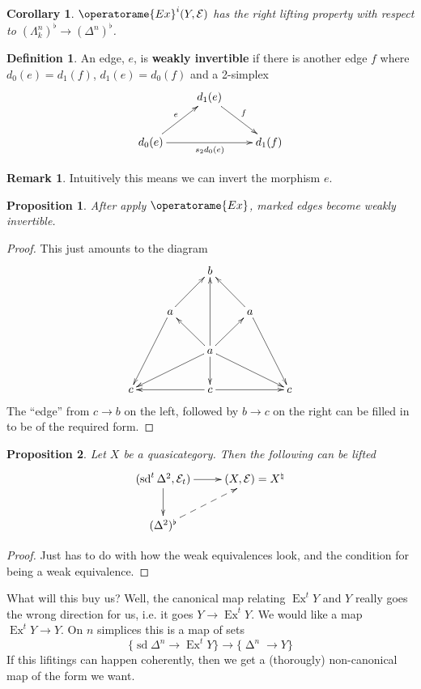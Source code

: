 \documentclass[english]{amsart}
\newcommand{\mc}{\mathcal}
\newcommand{\Ex}{\operatorame{Ex}}
\newtheorem*{cor}{Corollary}
\newtheorem*{prop}{Proposition}
\theoremstyle{definition}
\newtheorem*{defn}{Definition}
\newtheorem*{rmk}{Remark}
\begin{document}
\begin{cor}
$\Ex^i (Y,\mc{E})$ has the right lifting property with respect to $(\Lambda^n_k)^\flat \to (\Delta^n)^\flat$. 
\end{cor}





\begin{defn}
An edge, $e$, is \textbf{weakly invertible} if there is another edge $f$ where $d_0 (e) = d_1 (f)$, $d_1 (e) = d_0 (f)$ and a 2-simplex
\[
\xymatrix{
 &  d_1 (e) \ar[dr]^f & \\
d_0 (e) \ar[ur]^e \ar[rr]_{s_2 d_0 (e)} & & d_1 (f) 
}
\]
\end{defn}

\begin{rmk}
Intuitively this means we can invert the morphism $e$. 
\end{rmk}

\begin{prop}
After apply $\Ex$, marked edges become weakly invertible. 
\end{prop}
\begin{proof}
This just amounts to the diagram
\[
\xymatrix{
 & & b & & \\
 & a\ar[ur]\ar[ddl] & & a \ar[ul]\ar[ddr]& \\
 & & a\ar[uu]\ar[dll]\ar[drr] \ar[ul]\ar[ur]\ar[d] & & \\
c & &c\ar[ll]\ar[rr] & & c
} 
\]
The ``edge'' from $c \to b$ on the left, followed by $b \to c$ on the right can be filled in to be of the required form. 
\end{proof}







\begin{prop}
Let $X$ be a quasicategory. Then the following can be lifted
\[
\xymatrix{
(\operatorname{sd}^t \Delta^2, \mc{E}_t) \ar[d]\ar[r] & (X,\mc{E}) = X^\natural\\
(\Delta^2)^\flat \ar@{-->}[ur] & 
}
\]
\end{prop}
\begin{proof}
Just has to do with how the weak equivalences look, and the condition for being a weak equivalence. 
\end{proof}

What will this buy us? Well, the canonical map relating $\operatorname{Ex}^t Y$ and $Y$ really goes the wrong direction for us, i.e. it goes $Y \to \operatorname{Ex}^t Y$. We would like a map $\operatorname{Ex}^t Y \to Y$. On $n$ simplices this is a map of sets
\[
\{\operatorname{sd} \Delta^n \to \operatorname{Ex}^t Y\} \to \{\operatorname{\Delta}^n \to Y\}
\]
If this lifitings can happen coherently, then we get a (thorougly) non-canonical map of the form we want. 
\end{document}
